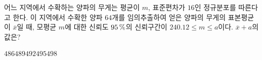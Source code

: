 어느 지역에서 수확하는 양파의 무게는 평균이 $m$, 표준편차가 $16$인 정규분포를 따른다고 한다. 이 지역에서 수확한 양파 $64$개를 임의추출하여 얻은 양파의 무게의 표본평균이 $\overline{x}$일 때, 모평균 $m$에 대한 신뢰도 $95\mkern3mu \%$의 신뢰구간이 $240.12\le m\le a$이다. $\overline{x}+a$의 값은? 
\begin{choices32}{$486$}{$489$}{$492$}{$495$}{$498$}\end{choices32}
